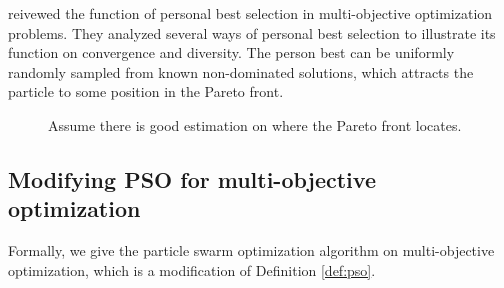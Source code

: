 \documentclass[12pt]{article}
\begin{document}
\cite{branke2006selecting} reivewed the function of personal best selection in multi-objective optimization problems. 
They analyzed several ways of personal best selection to illustrate its function on convergence and diversity.
The person best can be uniformly randomly sampled from known non-dominated solutions, which attracts the particle to some position in the Pareto front.

\begin{figure} 
  \centering 
  \caption{Assume there is good estimation on where the Pareto front locates.}
  \label{fig:perfect_est} %
\end{figure}


\subsection{Modifying PSO for multi-objective optimization}

Formally, we give the particle swarm optimization algorithm on multi-objective optimization, which is a modification of Definition \ref{def:pso}.
\end{document}
